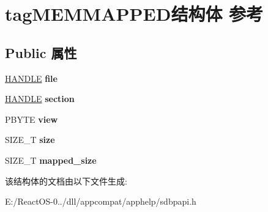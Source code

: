 \hypertarget{structtag_m_e_m_m_a_p_p_e_d}{}\section{tag\+M\+E\+M\+M\+A\+P\+P\+E\+D结构体 参考}
\label{structtag_m_e_m_m_a_p_p_e_d}
\subsection*{Public 属性}
\begin{DoxyCompactItemize}
\item 
\mbox{\label{structtag_m_e_m_m_a_p_p_e_d_aa982b05dce221ccd1d24716d538be18b}} 
\hyperlink{interfacevoid}{H\+A\+N\+D\+LE} {\bfseries file}
\item 
\mbox{\label{structtag_m_e_m_m_a_p_p_e_d_ad78728fd4653757dfbc9882fee87e4e1}} 
\hyperlink{interfacevoid}{H\+A\+N\+D\+LE} {\bfseries section}
\item 
\mbox{\label{structtag_m_e_m_m_a_p_p_e_d_a8d99496011d3b58cf7e4d55b8b8e8f76}} 
P\+B\+Y\+TE {\bfseries view}
\item 
\mbox{\label{structtag_m_e_m_m_a_p_p_e_d_a41d211bb0a9e5657864c15927c3ae17b}} 
S\+I\+Z\+E\+\_\+T {\bfseries size}
\item 
\mbox{\label{structtag_m_e_m_m_a_p_p_e_d_a92e52d5c79a26fe079de1ddc66a33a52}} 
S\+I\+Z\+E\+\_\+T {\bfseries mapped\+\_\+size}
\end{DoxyCompactItemize}


该结构体的文档由以下文件生成\+:\begin{DoxyCompactItemize}
\item 
E\+:/\+React\+O\+S-\/0../dll/appcompat/apphelp/sdbpapi.\+h\end{DoxyCompactItemize}
